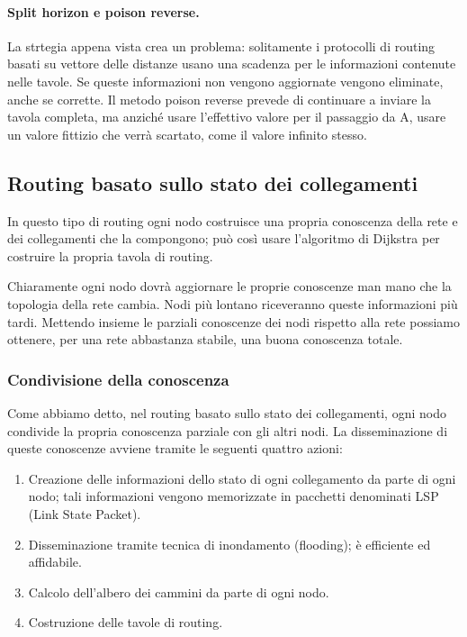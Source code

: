             \paragraph{Split horizon e poison reverse.} La strtegia appena vista crea un problema: solitamente i protocolli di routing basati su vettore delle distanze usano una scadenza per le informazioni contenute nelle tavole. Se queste informazioni non vengono aggiornate vengono eliminate, anche se corrette. Il metodo poison reverse prevede di continuare a inviare la tavola completa, ma anziché usare l'effettivo valore per il passaggio da A, usare un valore fittizio che verrà scartato, come il valore infinito stesso.
            
    \subsection{Routing basato sullo stato dei collegamenti}
        In questo tipo di routing ogni nodo costruisce una propria conoscenza della rete e dei collegamenti che la compongono; può così usare l'algoritmo di Dijkstra per costruire la propria tavola di routing.
        
        Chiaramente ogni nodo dovrà aggiornare le proprie conoscenze man mano che la topologia della rete cambia. Nodi più lontano riceveranno queste informazioni più tardi. Mettendo insieme le parziali conoscenze dei nodi rispetto alla rete possiamo ottenere, per una rete abbastanza stabile, una buona conoscenza totale.
        
        \subsubsection{Condivisione della conoscenza}
            Come abbiamo detto, nel routing basato sullo stato dei collegamenti, ogni nodo condivide la propria conoscenza parziale con gli altri nodi. La disseminazione di queste conoscenze avviene tramite le seguenti quattro azioni:
            \begin{enumerate}
                \item Creazione delle informazioni dello stato di ogni collegamento da parte di ogni nodo; tali informazioni vengono memorizzate in pacchetti denominati LSP (Link State Packet).
                
                \item Disseminazione tramite tecnica di inondamento (flooding); è efficiente ed affidabile.
                
                \item Calcolo dell'albero dei cammini da parte di ogni nodo.
                
                \item Costruzione delle tavole di routing.
            \end{enumerate}
            

